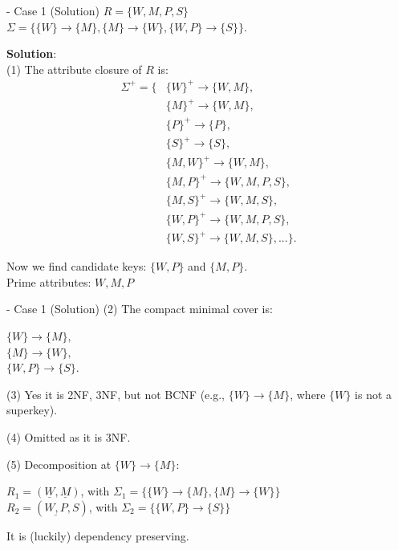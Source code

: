 \begin{frame}[fragile]{ - Case 1 (Solution)}
	$R = \{W, M, P, S\}$\\
	$\Sigma = \{\{W\} \rightarrow \{M\}, \{M\} \rightarrow \{W\},
	\{W, P\} \rightarrow \{S\}\}$.\\\vspace{5pt}
	
	\textbf{Solution}:\\
	(1) The attribute closure of $R$ is:
	\begin{align*} 
		\Sigma^{+} = \{&\{W\}^{+} \rightarrow \{W, M\},\\
		&\{M\}^{+} \rightarrow \{W, M\},\\
		&\{P\}^{+} \rightarrow \{P\},\\
		&\{S\}^{+} \rightarrow \{S\},\\
		&\{{M,W}\}^{+} \rightarrow \{W, M\},\\
		&\{{M,P}\}^{+} \rightarrow \{W, M, P, S\},\\
		&\{{M,S}\}^{+} \rightarrow \{W, M, S\},\\
		&\{{W,P}\}^{+} \rightarrow \{W, M, P, S\},\\
		&\{{W,S}\}^{+} \rightarrow \{W, M, S\},...\}.
	\end{align*} 
	
	Now we find candidate keys: $\{W, P\}$ and $\{M, P\}$.\\
	Prime attributes: $W, M, P$
\end{frame}

\begin{frame}[fragile]{ - Case 1 (Solution)}
	(2) The compact minimal cover is:\\\vspace{5pt}
	
	$\{W\} \rightarrow \{M\},$\\
	$\{M\}  \rightarrow \{W\},$\\
	$\{W, P\} \rightarrow \{S\}.$\\\vspace{5pt}
	
	(3)  Yes it is 2NF, 3NF, but not BCNF (e.g., $\{W\} \rightarrow \{M\}$, where $\{W\}$ is not a superkey).\\\vspace{5pt}
	
	(4) Omitted as it is 3NF. \\\vspace{5pt}
	
	(5) Decomposition at $\{W\} \rightarrow \{M\}$:\\\vspace{5pt}
	
	$R_1 = (\underline{W}, \underline{M})$, with $\Sigma_1 =\{\{W\} \rightarrow \{M\}, \{M\}  \rightarrow \{W\}\}$\\
	$R_2 = (\underline{W,P}, S)$, with $\Sigma_2 =\{\{W,P\} \rightarrow \{S\}\}$\\ \vspace{5pt}
	
	It is (luckily) dependency preserving.
	
\end{frame}

